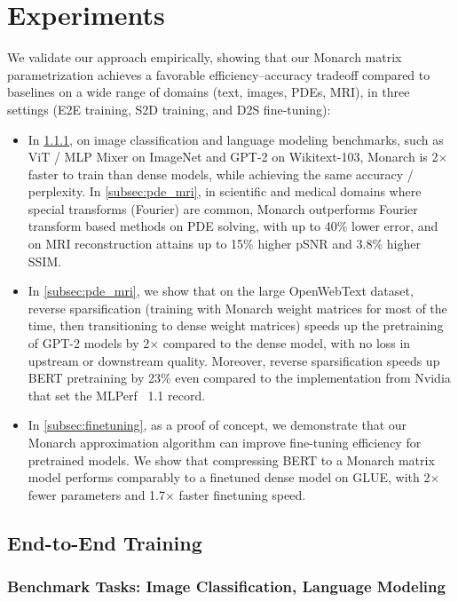 \section{Experiments}
\label{sec:experiments}

We validate our approach empirically, showing that our Monarch matrix parametrization achieves a favorable efficiency--accuracy tradeoff compared to baselines on a wide range of domains (text, images, PDEs, MRI), in three settings (E2E training, S2D training, and D2S fine-tuning):
\begin{itemize}[leftmargin=*,nosep,nolistsep,noitemsep]
\item
In \cref{subsec:benchmark_tasks}, on image classification and language modeling benchmarks, such as ViT / MLP Mixer on ImageNet and GPT-2 on Wikitext-103, Monarch is 2$\times$ faster to train than dense models, while achieving the same accuracy / perplexity. In \cref{subsec:pde_mri}, in scientific and medical domains where special transforms (Fourier) are common, Monarch outperforms Fourier transform based methods on PDE solving, with up to 40\% lower error, and on MRI reconstruction attains up to 15\% higher pSNR and 3.8\% higher SSIM.
\item In \cref{subsec:pde_mri}, we show that on the large OpenWebText dataset, reverse sparsification (training with Monarch weight matrices for most of the time, then transitioning to dense weight matrices) speeds up the pretraining of GPT-2 models by 2$\times$ compared to the dense model, with no loss in upstream or downstream quality.
Moreover, reverse sparsification speeds up BERT pretraining by 23\% even compared to the implementation from Nvidia that set the MLPerf~\citep{mattson2020mlperf} 1.1 record.
\item In \cref{subsec:finetuning}, as a proof of concept, we demonstrate that our Monarch approximation algorithm can improve fine-tuning efficiency for pretrained models. We show that compressing BERT to a Monarch matrix model performs comparably to a finetuned dense model on GLUE, with 2$\times$ fewer parameters and 1.7$\times$ faster finetuning speed.
\end{itemize}

\subsection{End-to-End Training}
\label{subsec:e2e_training}
\subsubsection{Benchmark Tasks: Image Classification, Language Modeling}
\label{subsec:benchmark_tasks}

